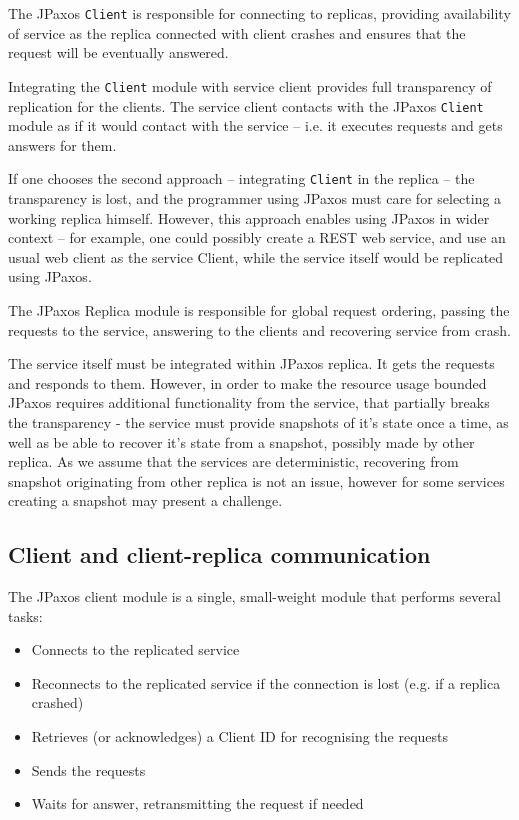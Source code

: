 The JPaxos \texttt{Client} is responsible for connecting to replicas, providing availability of service as the replica connected with client crashes and ensures that the request will be eventually answered.

Integrating the \texttt{Client} module with service client provides full transparency of replication for the clients.
The service client contacts with the JPaxos \texttt{Client} module as if it would contact with the service -- i.e. it executes requests and gets answers for them.

If one chooses the second approach -- integrating \texttt{Client} in the replica -- the transparency is lost, and the programmer using JPaxos must care for selecting a working replica himself. However, this approach enables using JPaxos in wider context -- for example, one could possibly create a REST web service, and use an usual web client as the service Client, while the service itself would be replicated using JPaxos.

The JPaxos Replica module is responsible for global request ordering, passing the requests to the service, answering to the clients and recovering service from crash.

The service itself must be integrated within JPaxos replica. It gets the requests and responds to them. However, in order to make the resource usage bounded JPaxos requires additional functionality from the service, that partially breaks the transparency - the service must provide snapshots of it's state
once a time, %
as well as be able to recover it's state from a snapshot, possibly made by other replica.
As we assume that the services are deterministic, recovering from snapshot originating from other replica is not an issue, however for some services creating a snapshot may present a challenge.

\subsection{Client and client-replica communication}

The JPaxos client module is a single, small-weight module that performs several tasks:
\begin{itemize} 
 \item Connects to the replicated service
 \item Reconnects to the replicated service if the connection is lost (e.g. if a replica crashed)
 \item Retrieves (or acknowledges) a Client ID for recognising the requests
 \item Sends the requests
 \item Waits for answer, retransmitting the request if needed
\end{itemize}

